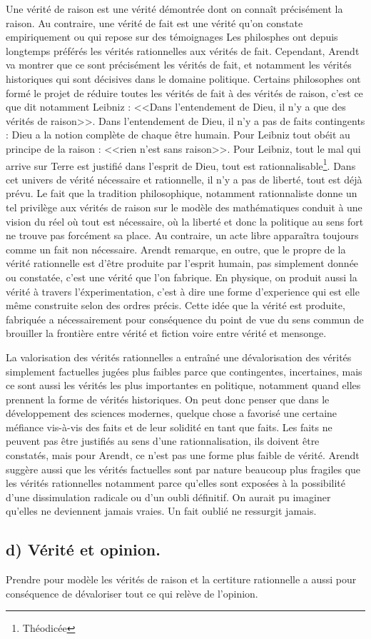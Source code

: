 \documentclass[12pt]{article}
\begin{document}
Une vérité de raison est une vérité démontrée dont on connaît précisément la raison.
Au contraire, une vérité de fait est une vérité qu'on constate empiriquement ou qui repose sur des témoignages
Les philosphes ont depuis longtemps préférés les vérités rationnelles aux vérités de fait.
Cependant, Arendt va montrer que ce sont précisément les vérités de fait, et notamment les vérités historiques qui sont décisives dans le domaine politique.
Certains philosophes ont formé le projet de réduire toutes les vérités de fait à des vérités de raison, c'est ce que dit notamment Leibniz : <<Dans l'entendement de Dieu, il n'y a que des vérités de raison>>.
Dans l'entendement de Dieu, il n'y a pas de faits contingents : Dieu a la notion complète de chaque être humain. Pour Leibniz tout obéit au principe de la raison : <<rien n'est sans raison>>.
Pour Leibniz, tout le mal qui arrive sur Terre est justifié dans l'esprit de Dieu, tout est rationnalisable\footnote{Théodicée}.
Dans cet univers de vérité nécessaire et rationnelle, il n'y a pas de liberté, tout est déjà prévu.
Le fait que la tradition philosophique, notamment rationnaliste donne un tel privilège aux vérités de raison sur le modèle des mathématiques conduit à une vision du réel où tout est nécessaire, où la liberté et donc la politique au sens fort ne trouve pas forcément sa place.
Au contraire, un acte libre apparaîtra toujours comme un fait non nécessaire.
Arendt remarque, en outre, que le propre de la vérité rationnelle est d'être produite par l'esprit humain, pas simplement donnée ou constatée, c'est une vérité que l'on fabrique.
En physique, on produit aussi la vérité à travers l'éxperimentation, c'est à dire une forme d'experience qui est elle même construite selon des ordres précis.
Cette idée que la vérité est produite, fabriquée a nécessairement pour conséquence du point de vue du sens commun de brouiller la frontière entre vérité et fiction voire entre vérité et mensonge.

La valorisation des vérités rationnelles a entraîné une dévalorisation des vérités simplement factuelles jugées plus faibles parce que contingentes, incertaines, mais ce sont aussi les vérités les plus importantes en politique, notamment quand elles prennent la forme de vérités historiques.
On peut donc penser que dans le développement des sciences modernes, quelque chose a favorisé une certaine méfiance vis-à-vis des faits et de leur solidité en tant que faits.
Les faits ne peuvent pas être justifiés au sens d'une rationnalisation, ils doivent être constatés, mais pour Arendt, ce n'est pas une forme plus faible de vérité.
Arendt suggère aussi que les vérités factuelles sont par nature beaucoup plus fragiles que les vérités rationnelles notamment parce qu'elles sont exposées à la possibilité d'une dissimulation radicale ou d'un oubli définitif.
On aurait pu imaginer qu'elles ne deviennent jamais vraies.
Un fait oublié ne ressurgit jamais.
\subsection*{d) Vérité et opinion.}
Prendre pour modèle les vérités de raison et la certiture rationnelle a aussi pour conséquence de dévaloriser tout ce qui relève de l'opinion.
\end{document}
